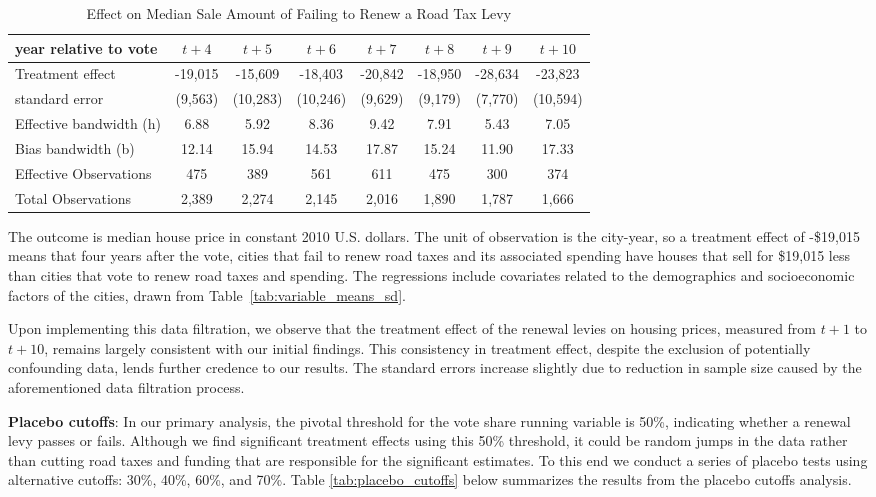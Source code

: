 \begin{table}[ht]
    \centering
    \caption{Effect on Median Sale Amount of Failing to Renew a Road Tax Levy}
    \label{tab:uncontaminated}
    \begin{tabular}{p{2.8cm}ccccccc}
        \hline
        year relative to vote & $t + 4$ & $t + 5$ & $t + 6$ & $t + 7$ & $t + 8$ & $t + 9$ & $t + 10$ \\
        \hline
        Treatment effect & -19,015 & -15,609 & -18,403 & -20,842 & -18,950 & -28,634 & -23,823 \\
        standard error   & (9,563) & (10,283) & (10,246) & (9,629) & (9,179) & (7,770)  & (10,594) \\
        Effective bandwidth (h) & 6.88 & 5.92 & 8.36 & 9.42 & 7.91 & 5.43 & 7.05 \\
        Bias bandwidth (b)      & 12.14 & 15.94 & 14.53 & 17.87 & 15.24 & 11.90 & 17.33 \\
        Effective Observations  & 475 & 389 & 561 & 611 & 475 & 300 & 374 \\
        Total Observations      & 2,389 & 2,274 & 2,145 & 2,016 & 1,890 & 1,787 & 1,666 \\
        \hline
    \end{tabular}
    \begin{tablenotes}
        \small
        \item The outcome is median house price in constant 2010 U.S. dollars. The unit of observation is the city-year, so a treatment effect of -\$19,015 means that four years after the vote, cities that fail to renew road taxes and its associated spending have houses that sell for \$19,015 less than cities that vote to renew road taxes and spending. The regressions include covariates related to the demographics and socioeconomic factors of the cities, drawn from Table~\ref{tab:variable_means_sd}.
    \end{tablenotes}
\end{table}


Upon implementing this data filtration, we observe that the treatment effect of the renewal levies on housing prices, measured from $t+1$ to $t+10$, remains largely consistent with our initial findings. This consistency in treatment effect, despite the exclusion of potentially confounding data, lends further credence to our results. The standard errors increase slightly due to reduction in sample size caused by the aforementioned data filtration process. 

\textbf{Placebo cutoffs}: In our primary analysis, the pivotal threshold for the vote share running variable is 50\%, indicating whether a renewal levy passes or fails.  Although we find significant treatment effects using this 50\% threshold, it could be random jumps in the data rather than cutting road taxes and funding that are responsible for the significant estimates.  To this end we conduct a series of placebo tests using alternative cutoffs: 30\%, 40\%, 60\%, and 70\%. Table \ref{tab:placebo_cutoffs} below summarizes the results from the placebo cutoffs analysis. 

